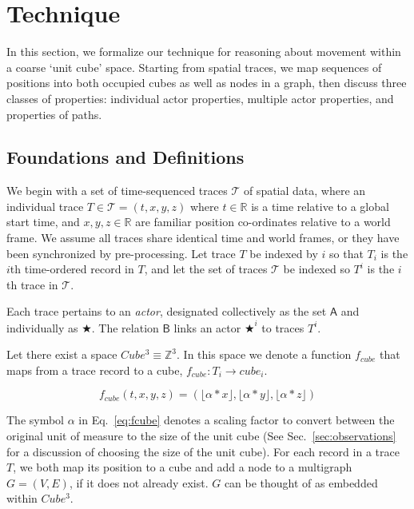 \section{Technique}
\label{sec:technique}

In this section, we formalize our technique for reasoning about movement within a coarse `unit cube' space.
Starting from spatial traces, we map sequences of positions into both occupied cubes as well as nodes in a graph, then discuss three classes of properties: individual actor properties, multiple actor properties, and properties of paths.

\subsection{Foundations and Definitions}
We begin with a set of time-sequenced traces $\mathcal{T}$ of spatial data, where an individual trace $T\in\mathcal{T} = (t,x,y,z)$ where $t\in\mathbb{R}$ is a time relative to a global start time, and $x,y,z\in \mathbb{R}$ are familiar position co-ordinates relative to a world frame. 
We assume all traces share identical time and world frames, or they have been synchronized by pre-processing.
Let trace $T$ be indexed by $i$ so that $T_i$ is the $i$th time-ordered record in $T$, and let the set of traces $\mathcal{T}$ be indexed so $T^i$ is the $i$th trace in $\mathcal{T}$. 

Each trace pertains to an \emph{actor}, designated collectively as the set $\mathsf{A}$ and individually as $\bigstar$. 
The relation $\mathsf{B}$ links an actor $\bigstar^i$ to traces $T^i$.


Let there exist a space $Cube^3 \equiv \mathbb{Z}^3$.  In this space we denote a function $f_{cube}$ that maps from a trace record to a cube, $f_{cube} : T_i \rightarrow cube_i$. 


\begin{equation}
f_{cube}(t,x,y,z) = (\lfloor \alpha * x \rfloor, \lfloor \alpha * y \rfloor , \lfloor \alpha * z \rfloor )
\label{eq:fcube}
\end{equation}

The symbol $\alpha$ in Eq.~\ref{eq:fcube} denotes a scaling factor to convert between the original unit of measure to the size of the unit cube (See Sec.~\ref{sec:observations} for a discussion of choosing the size of the unit cube).
For each record in a trace $T$, we both map its position to a cube and add a node to a multigraph $G = (V,E)$, if it does not already exist. $G$ can be thought of as embedded within $Cube^3$.

